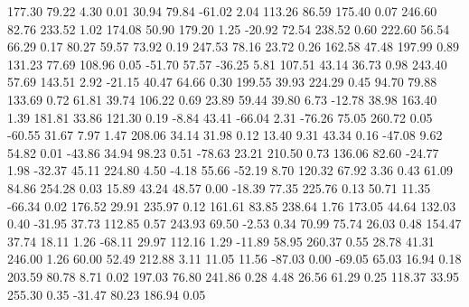   177.30   79.22    4.30    0.01
   30.94   79.84  -61.02    2.04
  113.26   86.59  175.40    0.07
  246.60   82.76  233.52    1.02
  174.08   50.90  179.20    1.25
  -20.92   72.54  238.52    0.60
  222.60   56.54   66.29    0.17
   80.27   59.57   73.92    0.19
  247.53   78.16   23.72    0.26
  162.58   47.48  197.99    0.89
  131.23   77.69  108.96    0.05
  -51.70   57.57  -36.25    5.81
  107.51   43.14   36.73    0.98
  243.40   57.69  143.51    2.92
  -21.15   40.47   64.66    0.30
  199.55   39.93  224.29    0.45
   94.70   79.88  133.69    0.72
   61.81   39.74  106.22    0.69
   23.89   59.44   39.80    6.73
  -12.78   38.98  163.40    1.39
  181.81   33.86  121.30    0.19
   -8.84   43.41  -66.04    2.31
  -76.26   75.05  260.72    0.05
  -60.55   31.67    7.97    1.47
  208.06   34.14   31.98    0.12
   13.40    9.31   43.34    0.16
  -47.08    9.62   54.82    0.01
  -43.86   34.94   98.23    0.51
  -78.63   23.21  210.50    0.73
  136.06   82.60  -24.77    1.98
  -32.37   45.11  224.80    4.50
   -4.18   55.66  -52.19    8.70
  120.32   67.92    3.36    0.43
   61.09   84.86  254.28    0.03
   15.89   43.24   48.57    0.00
  -18.39   77.35  225.76    0.13
   50.71   11.35  -66.34    0.02
  176.52   29.91  235.97    0.12
  161.61   83.85  238.64    1.76
  173.05   44.64  132.03    0.40
  -31.95   37.73  112.85    0.57
  243.93   69.50   -2.53    0.34
   70.99   75.74   26.03    0.48
  154.47   37.74   18.11    1.26
  -68.11   29.97  112.16    1.29
  -11.89   58.95  260.37    0.55
   28.78   41.31  246.00    1.26
   60.00   52.49  212.88    3.11
   11.05   11.56  -87.03    0.00
  -69.05   65.03   16.94    0.18
  203.59   80.78    8.71    0.02
  197.03   76.80  241.86    0.28
    4.48   26.56   61.29    0.25
  118.37   33.95  255.30    0.35
  -31.47   80.23  186.94    0.05
